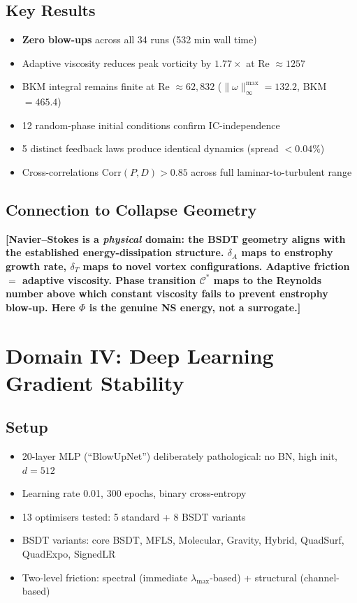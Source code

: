 \documentclass[11pt,a4paper]{article}
\newcommand{\Cman}{\mathcal{C}^*}
\begin{document}
\subsection{Key Results}
\begin{itemize}[nosep]
  \item \textbf{Zero blow-ups} across all 34 runs (532 min wall time)
  \item Adaptive viscosity reduces peak vorticity by $1.77\times$ at Re $\approx 1257$
  \item BKM integral remains finite at Re $\approx 62{,}832$
        ($\|\omega\|_\infty^{\max} = 132.2$, BKM $= 465.4$)
  \item 12 random-phase initial conditions confirm IC-independence
  \item 5 distinct feedback laws produce identical dynamics (spread $< 0.04\%$)
  \item Cross-correlations $\mathrm{Corr}(P, D) > 0.85$ across full laminar-to-turbulent range
\end{itemize}

\subsection{Connection to Collapse Geometry}
\textbf{[Navier--Stokes is a \emph{physical} domain: the BSDT
geometry aligns with the established energy-dissipation structure.
$\delta_A$ maps to enstrophy growth rate, $\delta_T$ maps to
novel vortex configurations.  Adaptive friction $=$ adaptive
viscosity.  Phase transition $\Cman$ maps to the Reynolds number
above which constant viscosity fails to prevent enstrophy blow-up.
Here $\Phi$ is the genuine NS energy, not a surrogate.]}


\section{Domain IV: Deep Learning Gradient Stability}\label{sec:nn}

\subsection{Setup}
\begin{itemize}[nosep]
  \item 20-layer MLP (``BlowUpNet'') deliberately pathological: no BN, high init, $d=512$
  \item Learning rate 0.01, 300 epochs, binary cross-entropy
  \item 13 optimisers tested: 5 standard + 8 BSDT variants
  \item BSDT variants: core BSDT, MFLS, Molecular, Gravity, Hybrid,
        QuadSurf, QuadExpo, SignedLR
  \item Two-level friction: spectral (immediate $\lambda_{\max}$-based) +
        structural (channel-based)
\end{itemize}
\end{document}
